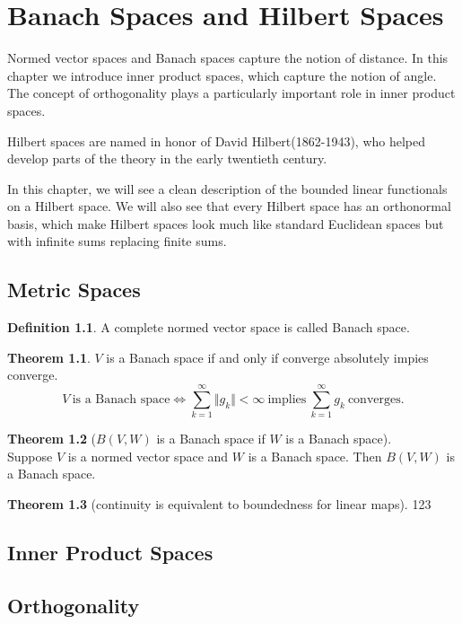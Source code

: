 \documentclass[12pt]{book}
\theoremstyle{definition}
\newtheorem{definition}{Definition}[chapter]
\newtheorem{theorem}{Theorem}[chapter]
\begin{document}
\chapter{Banach Spaces and  Hilbert Spaces}
Normed vector spaces and Banach spaces capture the notion of distance. In this chapter we introduce inner product spaces, which capture the notion of angle. The concept of orthogonality plays a particularly important role in inner product spaces. \par
Hilbert spaces are named in honor of David Hilbert(1862-1943), who helped develop parts of the theory in the early twentieth century. \par
In this chapter, we will see a clean description of the bounded linear functionals on a Hilbert space. We will also see that every Hilbert space has an orthonormal basis, which make Hilbert spaces look much like standard Euclidean spaces but with infinite sums replacing finite sums.
\newpage
\section{Metric Spaces}
\begin{definition}
A complete normed vector space is called Banach space.
\end{definition}
\begin{theorem}
$V$ is a Banach space if and only if converge absolutely impies converge.
$$
V \ \text{is a Banach space} \iff \sum_{k=1}^\infty \Vert g_k \Vert < \infty \ \text{implies}\  \sum_{k=1}^\infty g_k \ \text{converges}.
$$
\end{theorem}

\begin{theorem}[$B(V,W)$ is a Banach space if $W$ is a Banach space] \ \\
Suppose $V$ is a normed vector space and $W$ is a Banach space. Then $B(V,W)$ is a Banach space.	
\end{theorem}

\begin{theorem}[continuity is equivalent to boundedness for linear maps]
	123
\end{theorem}


\section{Inner Product Spaces}
\section{Orthogonality}
\end{document}
